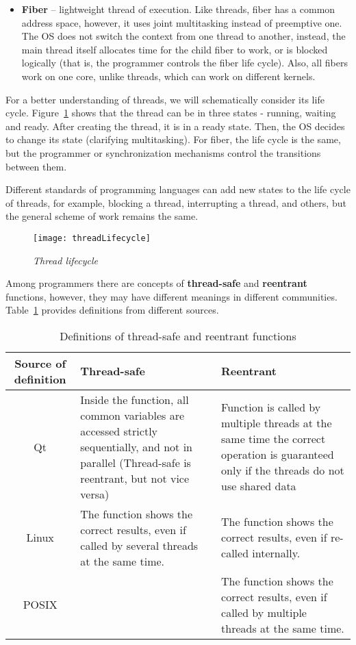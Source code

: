 {\begin{itemize}
			\item\textbf{Fiber} – lightweight thread of execution. Like threads, fiber has a common address space, however, it uses joint multitasking instead of preemptive one. The OS does not switch the context from one thread to another, instead, the main thread itself allocates time for the child fiber to work, or is blocked logically (that is, the programmer controls the fiber life cycle). Also, all fibers work on one core, unlike threads, which can work on different kernels.
		\end{itemize}
	\par For a better understanding of threads, we will schematically consider its life cycle. Figure~\ref{threadLifecycle:image} shows that the thread can be in three states - running, waiting and ready. After creating the thread, it is in a ready state. Then, the OS decides to change its state (clarifying multitasking). For fiber, the life cycle is the same, but the programmer or synchronization mechanisms control the transitions between them.
	\par Different standards of programming languages can add new states to the life cycle of threads, for example, blocking a thread, interrupting a thread, and others, but the general scheme of work remains the same.
		\begin{figure}[H]
			\texttt{[image: threadLifecycle]}
			\caption{\textit{Thread lifecycle}}
			\label{threadLifecycle:image}
		\end{figure}
	\par Among programmers there are concepts of \textbf{thread-safe} and \textbf{reentrant} functions, however, they may have different meanings in different communities. Table~\ref{threadSafeReentrant:table} provides definitions from different sources.
	\begin{table}[H]
		\caption{Definitions of thread-safe and reentrant functions}
		\label{threadSafeReentrant:table}
		\begin{center}
			\begin{tabularx} {\textwidth} { |c|X|X| }
				\hline 
		\textbf{	Source of definition}	& \textbf{Thread-safe} & \textbf{Reentrant} \\ 
				\hline 
				Qt & Inside the function, all common variables are accessed strictly sequentially, and not in parallel (Thread-safe is reentrant, but not vice versa)  &  Function is called by multiple threads at the same time the correct operation is guaranteed only if the threads do not use shared data \\ 
				\hline 
			Linux	&  The function shows the correct results, even if called by several threads at the same time. & The function shows the correct results, even if re-called internally. \\ 
				\hline
			POSIX	& \center{ ? } & The function shows the correct results, even if called by multiple threads at the same time. \\ 
				\hline 
			\end{tabularx} 


\end{center}
\end{table}}
